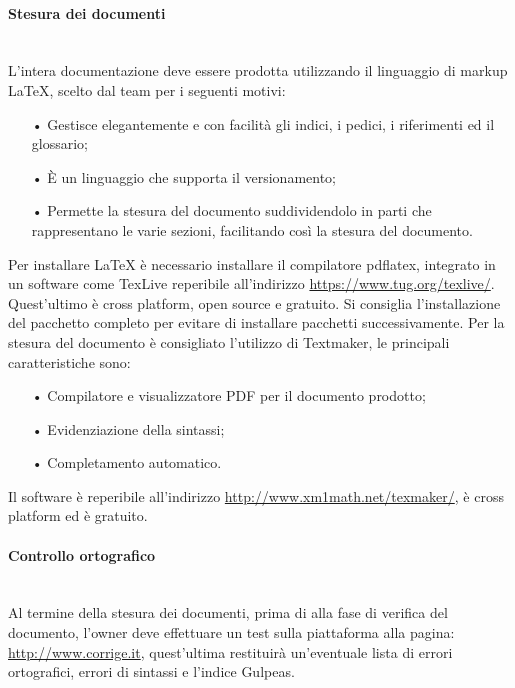 \paragraph{Stesura dei documenti}\mbox{}\\
L'intera documentazione deve essere prodotta utilizzando il {linguaggio di markup} \LaTeX{}, scelto dal team per i seguenti motivi:
\begin{itemize}
\item[•] Gestisce elegantemente e con facilità gli indici, i pedici, i riferimenti ed il glossario;
\item[•] È un linguaggio che supporta il {versionamento};
\item[•] Permette la stesura del documento suddividendolo in parti che rappresentano le varie sezioni, facilitando così la stesura del documento.
\end{itemize}
Per installare \LaTeX{} è necessario installare il compilatore pdflatex, integrato in un software come TexLive reperibile all'indirizzo \url{https://www.tug.org/texlive/}. Quest'ultimo è {cross platform}, {open source} e gratuito. Si consiglia l'installazione del pacchetto completo per evitare di installare pacchetti successivamente.
Per la stesura del documento è consigliato l'utilizzo di Textmaker, le principali caratteristiche sono:
\begin{itemize}
	\item[•] Compilatore e visualizzatore {PDF} per il documento prodotto;
	\item[•] Evidenziazione della sintassi;
	\item[•] Completamento automatico.
\end{itemize}  
Il software è reperibile all'indirizzo \url{http://www.xm1math.net/texmaker/}, è {cross platform} ed è gratuito.

\paragraph{Controllo ortografico}\mbox{}\\
Al termine della stesura dei documenti, prima di alla fase di verifica del documento, l’owner deve effettuare un test sulla piattaforma alla pagina: \url{ http://www.corrige.it}, quest’ultima restituirà un’eventuale lista di errori ortografici, errori di sintassi e l’indice Gulpeas.

